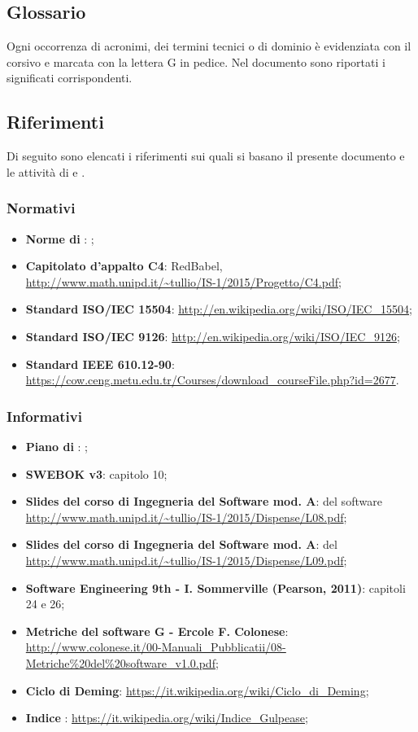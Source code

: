 \subsection{Glossario}
Ogni occorrenza di acronimi, dei termini tecnici o di dominio è evidenziata con il corsivo e marcata con la lettera G in pedice. Nel documento \Glossario  sono riportati i significati corrispondenti.

\subsection{Riferimenti}
Di seguito  sono elencati i riferimenti sui quali si basano il presente documento e le attività di  e .

\subsubsection{Normativi}
\begin{itemize}
\item \textbf{Norme di }: \NormeDiProgetto;
\item \textbf{Capitolato d'appalto C4}: RedBabel,  \url{http://www.math.unipd.it/~tullio/IS-1/2015/Progetto/C4.pdf};
\item \textbf{Standard ISO/IEC 15504}: \url{http://en.wikipedia.org/wiki/ISO/IEC_15504};
\item \textbf{Standard ISO/IEC 9126}: \url{http://en.wikipedia.org/wiki/ISO/IEC_9126};
\item \textbf{Standard IEEE 610.12-90}: \url{https://cow.ceng.metu.edu.tr/Courses/download_courseFile.php?id=2677}.
\end{itemize}
	
\subsubsection{Informativi}
\begin{itemize}
\item \textbf{Piano di }: \PianoDiProgetto;
\item \textbf{SWEBOK v3}: capitolo 10;
\item \textbf{Slides del corso di Ingegneria del Software mod. A}:  del software \url{http://www.math.unipd.it/~tullio/IS-1/2015/Dispense/L08.pdf};
\item \textbf{Slides del corso di Ingegneria del Software mod. A}:  del  \url{http://www.math.unipd.it/~tullio/IS-1/2015/Dispense/L09.pdf};
\item \textbf{Software Engineering 9th - I. Sommerville (Pearson, 2011)}: capitoli 24 e 26;
\item \textbf{Metriche del software G - Ercole F. Colonese}: \url{http://www.colonese.it/00-Manuali_Pubblicatii/08-Metriche%20del%20software_v1.0.pdf};
\item \textbf{Ciclo di Deming}: \url{https://it.wikipedia.org/wiki/Ciclo_di_Deming};
\item \textbf{Indice }: \url{https://it.wikipedia.org/wiki/Indice_Gulpease};
\end{itemize}
